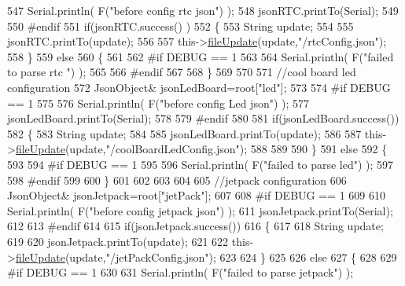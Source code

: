 \begin{DoxyCode}
547     Serial.println( F(\textcolor{stringliteral}{"before config rtc json"}) );
548     jsonRTC.printTo(Serial);
549 
550 \textcolor{preprocessor}{#endif}
551     \textcolor{keywordflow}{if}(jsonRTC.success() )
552     \{
553         String update;
554 
555         jsonRTC.printTo(update);
556 
557         this->\hyperlink{class_cool_file_system_a13f2958f5b87757c31fc53797a30d23a}{fileUpdate}(update,\textcolor{stringliteral}{"/rtcConfig.json"});           
558     \}
559     \textcolor{keywordflow}{else}
560     \{
561     
562 \textcolor{preprocessor}{    #if DEBUG == 1 }
563 
564         Serial.println( F(\textcolor{stringliteral}{"failed to parse rtc "}) );
565     
566 \textcolor{preprocessor}{    #endif}
567 
568     \}
569     
570     
571         \textcolor{comment}{//cool board led configuration}
572         JsonObject& jsonLedBoard=root[\textcolor{stringliteral}{"led"}];
573     
574 \textcolor{preprocessor}{#if DEBUG == 1 }
575 
576     Serial.println( F(\textcolor{stringliteral}{"before config Led json"}) );
577     jsonLedBoard.printTo(Serial);
578 
579 \textcolor{preprocessor}{#endif}
580 
581     \textcolor{keywordflow}{if}(jsonLedBoard.success())
582     \{   
583         String update;
584     
585         jsonLedBoard.printTo(update);
586 
587         this->\hyperlink{class_cool_file_system_a13f2958f5b87757c31fc53797a30d23a}{fileUpdate}(update,\textcolor{stringliteral}{"/coolBoardLedConfig.json"});      
588 
589     
590     \}
591     \textcolor{keywordflow}{else}
592     \{
593     
594 \textcolor{preprocessor}{    #if DEBUG == 1 }
595 
596         Serial.println( F(\textcolor{stringliteral}{"failed to parse led"}) );
597     
598 \textcolor{preprocessor}{    #endif }
599 
600     \}
601         
602 
603     
604 
605     \textcolor{comment}{//jetpack configuration}
606         JsonObject& jsonJetpack=root[\textcolor{stringliteral}{"jetPack"}];
607 
608 \textcolor{preprocessor}{#if DEBUG == 1 }
609 
610     Serial.println( F(\textcolor{stringliteral}{"before config jetpack json"}) );
611     jsonJetpack.printTo(Serial);
612 
613 \textcolor{preprocessor}{#endif}
614 
615     \textcolor{keywordflow}{if}(jsonJetpack.success())
616     \{
617     
618         String update;
619     
620         jsonJetpack.printTo(update);
621 
622         this->\hyperlink{class_cool_file_system_a13f2958f5b87757c31fc53797a30d23a}{fileUpdate}(update,\textcolor{stringliteral}{"/jetPackConfig.json"});       
623 
624     \}
625 
626     \textcolor{keywordflow}{else}
627     \{
628     
629 \textcolor{preprocessor}{    #if DEBUG == 1 }
630 
631         Serial.println( F(\textcolor{stringliteral}{"failed to parse jetpack"}) ); 

\end{DoxyCode}
